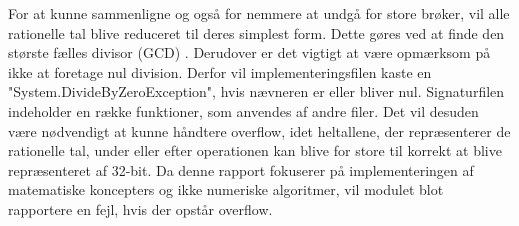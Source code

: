 
For at kunne sammenligne og også for nemmere at undgå for store brøker, vil alle rationelle tal blive reduceret til deres simplest form. Dette gøres ved at finde den største fælles divisor (GCD) . Derudover er det vigtigt at være opmærksom på ikke at foretage nul division. Derfor vil implementeringsfilen kaste en "System.DivideByZeroException", hvis nævneren er eller bliver nul. Signaturfilen indeholder en række funktioner, som anvendes af andre filer. Det vil desuden være nødvendigt at kunne håndtere overflow, idet heltallene, der repræsenterer de rationelle tal, under eller efter operationen kan blive for store til korrekt at blive repræsenteret af 32-bit. Da denne rapport fokuserer på implementeringen af matematiske koncepters og ikke numeriske algoritmer, vil modulet blot rapportere en fejl, hvis der opstår overflow.
 


